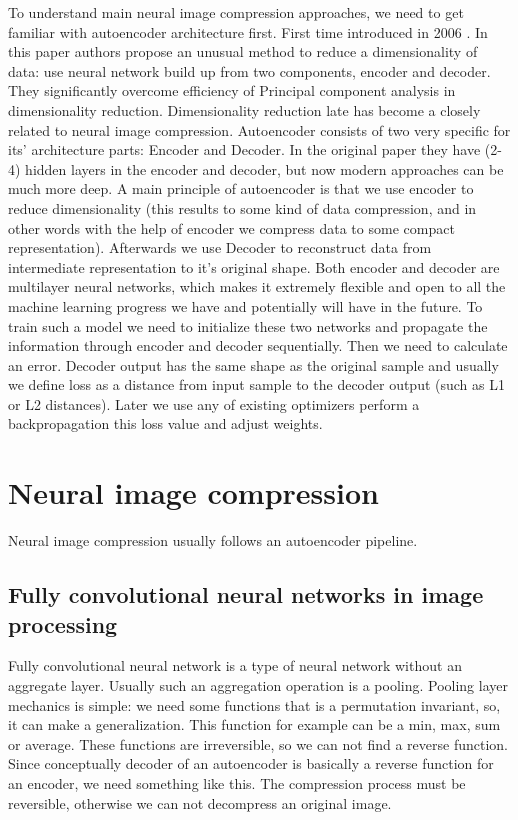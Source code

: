 To understand main neural image compression approaches, we need to get familiar with autoencoder architecture first. First time introduced in 2006 \cite{Autoencoder_2006}. In this paper authors propose an unusual method to reduce a dimensionality of data: use neural network build up from two components, encoder and decoder. They significantly overcome efficiency of Principal component analysis \cite{pca} in dimensionality reduction. Dimensionality reduction late has become a closely related to neural image compression. Autoencoder consists of two very specific for its' architecture parts: Encoder and Decoder. In the original paper they have (2-4) hidden layers in the encoder and decoder, but now modern approaches can be much more deep. A main principle of autoencoder is that we use encoder to reduce dimensionality (this results to some kind of data compression, and in other words with the help of encoder we compress data to some compact representation). Afterwards we use Decoder to reconstruct data from intermediate representation to it's original shape. Both encoder and decoder are multilayer neural networks, which makes it extremely flexible and open to all the machine learning progress we have and potentially will have in the future. To train such a model we need to initialize these two networks and propagate the information through encoder and decoder sequentially. Then we need to calculate an error. Decoder output has the same shape as the original sample and usually we define loss as a distance from input sample to the decoder output (such as L1 or L2 distances). Later we use any of existing optimizers perform a backpropagation this loss value and adjust weights.

\chapter{Neural image compression}

Neural image compression usually follows an autoencoder pipeline.

\section{Fully convolutional neural networks in image processing}

Fully convolutional neural network is a type of neural network without an aggregate layer. Usually such an aggregation operation is a pooling. Pooling layer mechanics is simple: we need some functions that is a permutation invariant, so, it can make a generalization. This function for example can be a min, max, sum or average. These functions are irreversible, so we can not find a reverse function. Since conceptually decoder of an autoencoder is basically a reverse function for an encoder, we need something like this. The compression process must be reversible, otherwise we can not decompress an original image.

